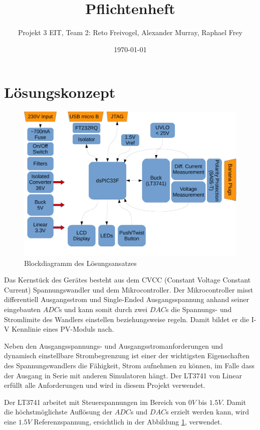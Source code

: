 \documentclass{article}
\title{Pflichtenheft}
\date{\today}
\author{Projekt 3 EIT, Team 2: Reto Freivogel, Alexander Murray, Raphael Frey}
\begin{document}
\maketitle

\section{L\"osungskonzept}
\begin{figure}[h!]
    \begin{centering}
    \includegraphics[width=.667\textwidth]{grob-blockdiagramm.pdf}
    \caption{Blockdiagramm des L\"osungsansatzes}
    \end{centering}
    \label{fig:grob-blockschaltbild}
\end{figure}

Das Kernst\"uck des Ger\"ates besteht  aus dem CVCC (Constant Voltage Constant
Current) Spannungswandler  und dem Mikrocontroller. Der  Mikrocontroller misst
differentiell Ausgangsstrom  und Single-Ended Ausgangsspannung  anhand seiner
eingebauten $ADC$s und  kann  somit   durch  zwei $DAC$s die  Spannungs-   und
Stromlimite  des  Wandlers einstellen  beziehungsweise regeln. Damit  bildet
er  die I-V  Kennlinie eines PV-Moduls nach.

Neben den Ausgangsspannungs- und Ausgangsstromanforderungen und dynamisch
einstellbare Strombegrenzung ist einer der wichtigsten Eigenschaften des
Spannungswandlers die F\"ahigkeit, Strom aufnehmen zu k\"onnen, im Falle dass
der Ausgang in Serie mit anderen Simulatoren h\"angt. Der LT3741 von Linear
erf\"ullt alle Anforderungen und wird in diesem Projekt verwendet.

Der LT3741 arbeitet mit Steuerspannungen im Bereich von $0V$ bis $1.5V$. Damit
die h\"ochstm\"oglichste Aufl\"osung der $ADC$s und $DAC$s erzielt werden kann,
wird eine $1.5V$ Referenzspannung, ersichtlich in der Abbildung
\ref{fig:grob-blockschaltbild}, verwendet.
\end{document}
